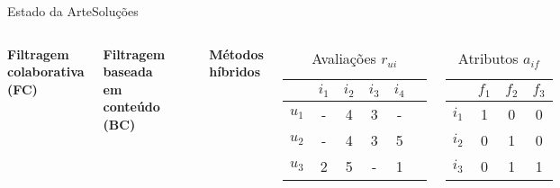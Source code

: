 \begin{frame}{Estado da Arte}{Soluções}
\begin{columns}[c]
\textbf{Filtragem colaborativa (FC)}


\textbf{Filtragem baseada em conteúdo (BC)}
\par{~}

\textbf{Métodos híbridos}



\begin{table}[hp]
\begin{center}
	\caption{Avaliações $r_{ui}$}
    \begin{tabular}{ | c | c | c | c | c | c |} 
    \hline
     & $i_1$ & $i_2$ & $i_3$ & $i_4$ \\ \hline
     $u_1$ & - & 4 & 3 & - \\ \hline
     $u_2$ & - & 4 & 3 & 5 \\ \hline
     $u_3$ & 2 & 5 & - & 1 \\ \hline
    \end{tabular}
\end{center}
\end{table}


\begin{table}[hp]
\begin{center}
    \caption{Atributos $a_{if}$}
    \begin{tabular}{ | c | c | c | c | } 
    \hline
     & $f_1$ & $f_2$ & $f_3$ \\ \hline
     $i_1$ & 1 & 0 & 0 \\ \hline
     $i_2$ & 0 & 1 & 0 \\ \hline
     $i_3$ & 0 & 1 & 1 \\ \hline
    \end{tabular}
\end{center}
\end{table}

\end{columns}
\end{frame}

